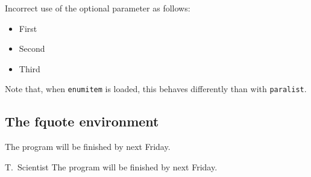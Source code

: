 Incorrect use of the optional parameter as follows:
\begin{itemize}
  \item[first] First
  \item[second] Second
  \item[third] Third
\end{itemize}
Note that, when \texttt{enumitem} is loaded, this behaves differently than with \texttt{paralist}.

\subsection{The fquote environment}

\begin{fquote}[T.\ Scientist]
  The program will be finished by next Friday.
\end{fquote}

\begin{gfquote}{T.\ Scientist}
  The program will be finished by next Friday.
\end{gfquote}
